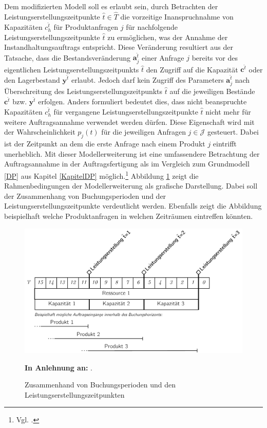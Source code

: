 Dem modifizierten Modell soll es erlaubt sein, durch Betrachten der Leistungserstellungszeitpunkte $\hat t \in \hat T$ die vorzeitige Inanspruchnahme von Kapazitäten $c_{h}^{\hat t}$ für Produktanfragen $j$ für nachfolgende Leistungserstellungszeitpunkte $\hat{t}$ zu ermöglichen, was der Annahme der Instandhaltungsauftrags entspricht. Diese Veränderung resultiert aus der Tatsache, dass die Bestandsveränderung $\textbf{a}_j^{\hat t}$ einer Anfrage $j$ bereits vor des eigentlichen Leistungserstellungszeitpunkts $\hat t$ den Zugriff auf die Kapazität $\textbf{c}^{\hat t}$ oder den Lagerbestand $\textbf{y}^{\hat t}$ erlaubt. Jedoch darf kein Zugriff des Parameters $\textbf{a}_j^{\hat t}$ nach Überschreitung des Leistungserstellungszeitpunkts $\hat t$ auf die jeweiligen Bestände $\textbf{c}^{\hat t}$ bzw. $\textbf{y}^{\hat t}$ erfolgen. Anders formuliert bedeutet dies, dass nicht beanspruchte Kapazitäten $c_{h}^{\hat t}$ für vergangene Leistungserstellungszeitpunkte $\hat t$ nicht mehr für weitere Auftragsannahme verwendet werden dürfen. Diese Eigenschaft wird mit der Wahrscheinlichkeit $p_j(t)$ für die jeweiligen Anfragen $j\in\mathcal{J}$ gesteuert. Dabei ist der Zeitpunkt an dem die erste Anfrage nach einem Produkt $j$ eintrifft unerheblich. Mit dieser Modellerweiterung ist eine umfassendere Betrachtung der Auftragsannahme in der Auftragsfertigung als im Vergleich zum Grundmodell \ref{DP} aus Kapitel \ref{KapitelDP} möglich.\footnote{Vgl. \cite{lars}.} Abbildung \ref{LP2} zeigt die Rahmenbedingungen der Modellerweiterung als grafische Darstellung. Dabei soll der Zusammenhang von Buchungsperioden und der Leistungserstellungszeitpunkte verdeutlicht werden. Ebenfalls zeigt die Abbildung beispielhaft welche Produktanfragen in welchen Zeiträumen eintreffen könnten.

\begin{figure}[h!]
  \begin{center}
    \includegraphics[width=130mm]{Bilder/Leistungsperioden2.pdf}
    \caption{Zusammenhand von Buchungsperioden und den Leistungserstellungszeitpunkten}  \label{LP2}
    {\footnotesize \textbf{In Anlehnung an:} \cite{lars}}. 
  \end{center}
\end{figure}



